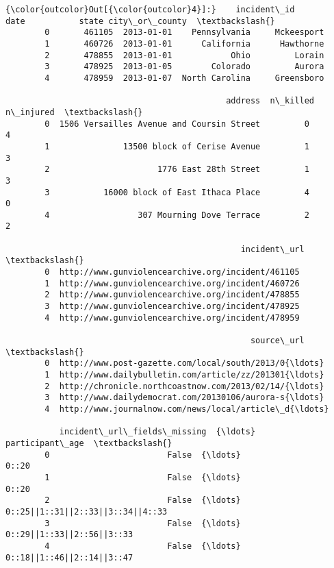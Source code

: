 \documentclass[11pt]{article}
\begin{document}
\begin{Verbatim}[commandchars=\\\{\}]
{\color{outcolor}Out[{\color{outcolor}4}]:}    incident\_id        date           state city\_or\_county  \textbackslash{}
        0       461105  2013-01-01    Pennsylvania     Mckeesport   
        1       460726  2013-01-01      California      Hawthorne   
        2       478855  2013-01-01            Ohio         Lorain   
        3       478925  2013-01-05        Colorado         Aurora   
        4       478959  2013-01-07  North Carolina     Greensboro   
        
                                             address  n\_killed  n\_injured  \textbackslash{}
        0  1506 Versailles Avenue and Coursin Street         0          4   
        1               13500 block of Cerise Avenue         1          3   
        2                      1776 East 28th Street         1          3   
        3           16000 block of East Ithaca Place         4          0   
        4                  307 Mourning Dove Terrace         2          2   
        
                                                incident\_url  \textbackslash{}
        0  http://www.gunviolencearchive.org/incident/461105   
        1  http://www.gunviolencearchive.org/incident/460726   
        2  http://www.gunviolencearchive.org/incident/478855   
        3  http://www.gunviolencearchive.org/incident/478925   
        4  http://www.gunviolencearchive.org/incident/478959   
        
                                                  source\_url  \textbackslash{}
        0  http://www.post-gazette.com/local/south/2013/0{\ldots}   
        1  http://www.dailybulletin.com/article/zz/201301{\ldots}   
        2  http://chronicle.northcoastnow.com/2013/02/14/{\ldots}   
        3  http://www.dailydemocrat.com/20130106/aurora-s{\ldots}   
        4  http://www.journalnow.com/news/local/article\_d{\ldots}   
        
           incident\_url\_fields\_missing  {\ldots}                    participant\_age  \textbackslash{}
        0                        False  {\ldots}                              0::20   
        1                        False  {\ldots}                              0::20   
        2                        False  {\ldots}  0::25||1::31||2::33||3::34||4::33   
        3                        False  {\ldots}         0::29||1::33||2::56||3::33   
        4                        False  {\ldots}         0::18||1::46||2::14||3::47   
        

\end{Verbatim}
\end{document}
